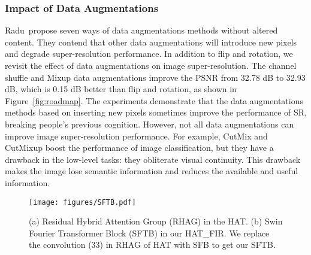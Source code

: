 \documentclass[10pt,twocolumn,letterpaper]{article}
\begin{document}
\subsubsection{Impact of Data Augmentations}
Radu~\etal propose seven ways of data augmentations methods without altered content. They contend that other data augmentations will introduce new pixels and degrade super-resolution performance. In addition to flip and rotation, we revisit the effect of data augmentations on image super-resolution. The channel shuffle and Mixup data augmentations improve the PSNR from 32.78 dB to 32.93 dB, which is 0.15 dB better than flip and rotation, as shown in Figure~\ref{fig:roadmap}. The experiments demonstrate that the data augmentations methods based on inserting new pixels sometimes improve the performance of SR, breaking people's previous cognition. However, not all data augmentations can improve image super-resolution performance. For example, CutMix and CutMixup boost the performance of image classification, but they have a drawback in the low-level tasks: they obliterate visual continuity. This drawback makes the image lose semantic information and reduces the available and useful information. 

\begin{figure}[h]
	\centering
	\texttt{[image: figures/SFTB.pdf]}
\caption{(a) Residual Hybrid Attention Group (RHAG) in the HAT. (b) Swin Fourier Transformer Block (SFTB) in our HAT\_FIR. We replace the convolution (33) in RHAG of HAT with SFB to get our SFTB.} 
	\label{fig:SFTB}
\end{figure}
\end{document}
